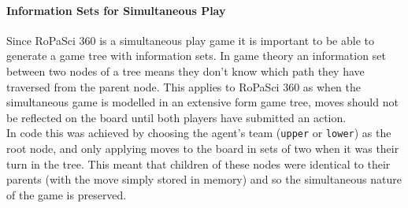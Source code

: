 \documentclass{article}
\begin{document}
\paragraph{Information Sets for Simultaneous Play}
Since RoPaSci 360 is a simultaneous play game it is important to be able to generate a game tree with information sets. In game theory an information set between two nodes of a tree means they don't know which path they have traversed from the parent node. This applies to RoPaSci 360 as when the simultaneous game is modelled in an extensive form game tree, moves should not be reflected on the board until both players have submitted an action.\\[2mm]
In code this was achieved by choosing the agent's team (\verb|upper| or \verb|lower|) as the root node, and only applying moves to the board in sets of two when it was their turn in the tree. This meant that children of these nodes were identical to their parents (with the move simply stored in memory) and so the simultaneous nature of the game is preserved.
\end{document}
